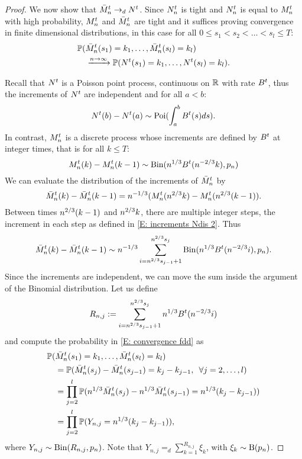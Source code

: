 \begin{proof}
We now show that $\bar{M}_n^t \rightarrow_d N^t$.
Since $N_n^t$ is tight and $N_n^t$ is equal to $M_n^t$ with high probability,
$M_n^t$ and $\bar{M}_n^t$ are tight and it suffices proving convergence in finite dimensional distributions,
in this case for all $0 \leq s_1 < s_2 < \dots < s_l \leq T$:
\begin{equation} \label{E: convergence fdd}
\begin{aligned}
&\mathbb{P}( \bar{M}_n^t(s_1) = k_1, \dots, \bar{M}_n^t(s_l) = k_l ) \\
&\quad \xrightarrow{n \rightarrow \infty}  \mathbb{P}( N^t(s_1) = k_1, \dots, N^t(s_l) = k_l ).
\end{aligned}
\end{equation}

Recall that $N^t$ is a Poisson point process, continuous on $\mathbb{R}$ with rate $B^t$,
thus the increments of $N^t$ are independent and for all $a<b$: 
\begin{equation}
N^t(b) - N^t(a) \sim \operatorname*{Poi}( \int_{a}^{b} B^t(s)ds).
\end{equation}
In contrast, $M_n^t$ is a discrete process whose increments are defined by $B^t$ at integer times, 
that is for all $k \leq T$: 
\begin{equation} \label{E: increments Ndis 2}
M_n^t(k) - M_n^t(k-1) \sim \operatorname*{Bin}(n^{1 / 3}B^t(n^{-2 / 3}k), p_n)
\end{equation}
We can evaluate the distribution of the increments of $\bar{M}_n^t$ by
\begin{equation}
\bar{M}_n^t(k) - \bar{M}_n^t(k-1) = n^{-1 / 3}( M_n^t(n^{2 / 3}k) - M_n^t(n^{2 / 3}(k-1)).
\end{equation}
Between times $n^{2 / 3}(k-1)$ and $n^{2 / 3}k$, there are multiple integer steps,
the increment in each step as defined in \eqref{E: increments Ndis 2}. 
Thus
\begin{equation}
\bar{M}_n^t(k) - \bar{M}_n^t(k-1) \sim n^{-1 / 3} \sum_{i=n^{2 / 3}s_{j-1}+1}^{n^{2 / 3}s_j} \operatorname*{Bin}( n^{1 / 3}B^t(n^{-2 / 3}i), p_n ).
\end{equation}
Since the increments are independent, we can move the sum inside the argument of the Binomial distribution.
Let us define 
\begin{equation*}
R_{n,j} := \sum_{i=n^{2 / 3}s_{j-1}+1}^{n^{2 / 3}s_j}n^{1 / 3}B^t(n^{-2 / 3}i)
\end{equation*}
and compute the probability in \eqref{E: convergence fdd} as
\begin{equation} \label{E: distribution Ndis}
\begin{aligned}
&\mathbb{P}(\bar{M}_n^t(s_1) = k_1, \dots, \bar{M}_n^t(s_l) = k_l) \\
&\quad = \mathbb{P}( \bar{M}_n^t(s_j) - \bar{M}_n^t(s_{j-1}) = k_j - k_{j-1}, \enspace \forall j=2,\dots,l ) \\
&\quad = \prod_{j=2}^{l} \mathbb{P}( n^{1 / 3}\bar{M}_n^t(s_j) - n^{1 / 3}\bar{M}_n^t(s_{j-1}) = n^{1 / 3}(k_j - k_{j-1})) \\
&\quad = \prod_{j=2}^{l} \mathbb{P}( Y_{n,j} = n^{1 / 3}(k_j - k_{j-1}) ),
\end{aligned}
\end{equation}
where $Y_{n,j} \sim \operatorname*{Bin}(R_{n,j}, p_n)$.
Note that $Y_{n,j} =_d \sum_{k=1}^{R_{n,j}} \xi_k$, with $\xi_k \sim \operatorname*{B}(p_n)$.


\end{proof}
